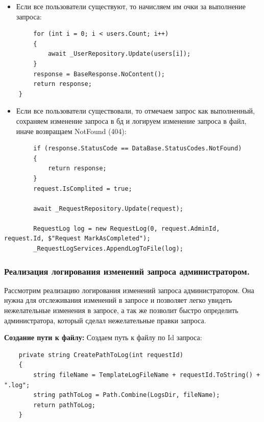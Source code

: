 \begin{itemize}
	\item{Если все пользователи существуют, то начисляем им очки за выполнение запроса:}
\end{itemize}
\begin{verbatim}
        for (int i = 0; i < users.Count; i++)
        {
            await _UserRepository.Update(users[i]);
        }
        response = BaseResponse.NoContent();
        return response;
    }
\end{verbatim}

\begin{itemize}
	\item{Если все пользователи существовали, то отмечаем запрос как выполненный, сохраняем изменение запроса в бд и логируем изменение запроса в файл, иначе возвращаем NotFound (404):}
\end{itemize}
\begin{verbatim}
        if (response.StatusCode == DataBase.StatusCodes.NotFound)
        {
            return response;
        }
        request.IsComplited = true;

        await _RequestRepository.Update(request);

        RequestLog log = new RequestLog(0, request.AdminId, request.Id, $"Request MarkAsCompleted");
        _RequestLogServices.AppendLogToFile(log);
\end{verbatim}

\subsubsection{Реализация логирования изменений запроса администратором.}

Рассмотрим реализацию логирования изменений запроса администратором. Она нужна для отслеживания изменений в запросе и позволяет легко увидеть нежелательные изменения в запросе, а так же позволит быстро определить администратора, который сделал нежелательные правки запроса.

\textbf{Создание пути к файлу:} Создаем путь к файлу по Id запроса:
\begin{verbatim}
    private string CreatePathToLog(int requestId)
    {
        string fileName = TemplateLogFileName + requestId.ToString() + ".log";
        string pathToLog = Path.Combine(LogsDir, fileName);
        return pathToLog;
    }
\end{verbatim}

